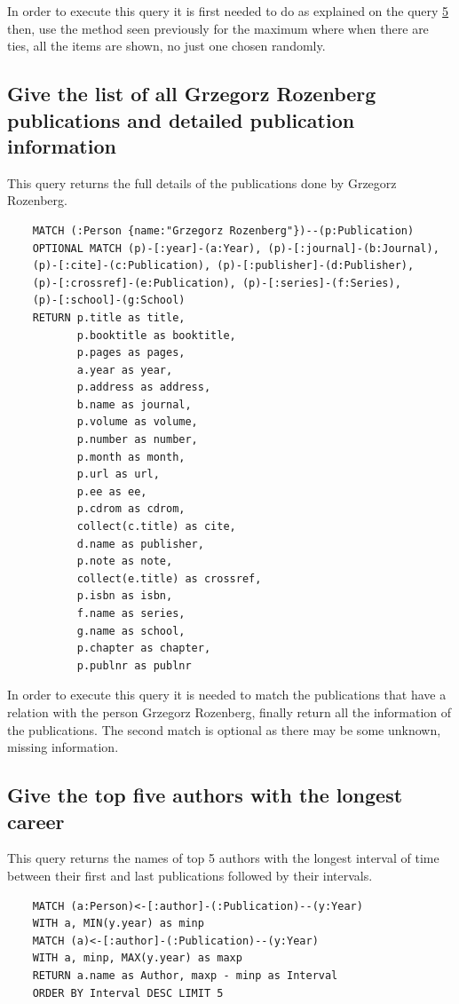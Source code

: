 \documentclass{article}
\begin{document}
In order to execute this query it is first needed to do as explained on the query \hyperref[3.5]{5} then, use the method seen previously for the maximum where when there are ties, all the items are shown, no just one chosen randomly.

\subsection{Give the list of all Grzegorz Rozenberg publications and detailed publication information}
This query returns the full details of the publications done by Grzegorz Rozenberg.

\begin{lstlisting}
    MATCH (:Person {name:"Grzegorz Rozenberg"})--(p:Publication)
    OPTIONAL MATCH (p)-[:year]-(a:Year), (p)-[:journal]-(b:Journal),
    (p)-[:cite]-(c:Publication), (p)-[:publisher]-(d:Publisher),
    (p)-[:crossref]-(e:Publication), (p)-[:series]-(f:Series),
    (p)-[:school]-(g:School)
    RETURN p.title as title,
    	   p.booktitle as booktitle,
           p.pages as pages,
           a.year as year,
           p.address as address,
           b.name as journal,
           p.volume as volume,
           p.number as number,
           p.month as month,
           p.url as url,
           p.ee as ee,
           p.cdrom as cdrom,
           collect(c.title) as cite,
           d.name as publisher,
           p.note as note,
           collect(e.title) as crossref,
           p.isbn as isbn,
           f.name as series,
           g.name as school,
           p.chapter as chapter,
           p.publnr as publnr
\end{lstlisting}

In order to execute this query it is needed to match the publications that have a relation with the person Grzegorz Rozenberg, finally return all the information of the publications. The second match is optional as there may be some unknown, missing information.

\subsection{Give the top five authors with the longest career}
This query returns the names of top 5 authors with the longest interval of time between their first and last publications followed by their intervals.

\begin{lstlisting}
    MATCH (a:Person)<-[:author]-(:Publication)--(y:Year)
    WITH a, MIN(y.year) as minp
    MATCH (a)<-[:author]-(:Publication)--(y:Year)
    WITH a, minp, MAX(y.year) as maxp
    RETURN a.name as Author, maxp - minp as Interval
    ORDER BY Interval DESC LIMIT 5
\end{lstlisting}
\end{document}

